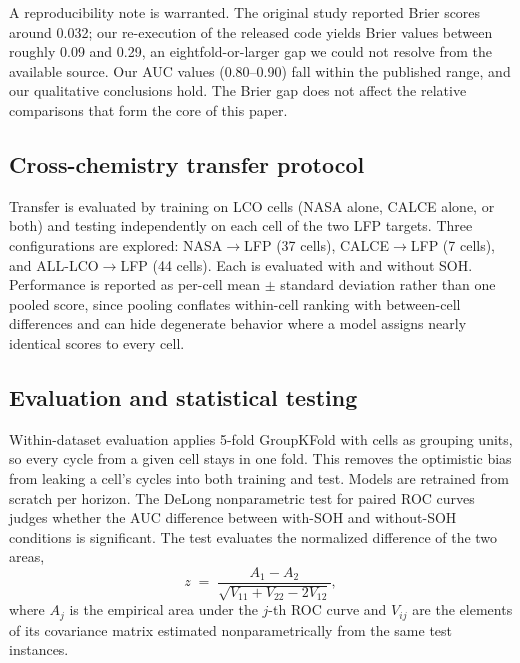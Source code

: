 \documentclass[journal]{IEEEtran}
\begin{document}
A reproducibility note is warranted. The original study \cite{shikdar2026learning} reported Brier scores around 0.032; our re-execution of the released code yields Brier values between roughly 0.09 and 0.29, an eightfold-or-larger gap we could not resolve from the available source. Our AUC values (0.80--0.90) fall within the published range, and our qualitative conclusions hold. The Brier gap does not affect the relative comparisons that form the core of this paper.

\subsection{Cross-chemistry transfer protocol}
Transfer is evaluated by training on LCO cells (NASA alone, CALCE alone, or both) and testing independently on each cell of the two LFP targets. Three configurations are explored: NASA$\to$LFP (37 cells), CALCE$\to$LFP (7 cells), and ALL-LCO$\to$LFP (44 cells). Each is evaluated with and without SOH. Performance is reported as per-cell mean $\pm$ standard deviation rather than one pooled score, since pooling conflates within-cell ranking with between-cell differences and can hide degenerate behavior where a model assigns nearly identical scores to every cell.

\subsection{Evaluation and statistical testing}
Within-dataset evaluation applies 5-fold GroupKFold with cells as grouping units, so every cycle from a given cell stays in one fold. This removes the optimistic bias from leaking a cell's cycles into both training and test. Models are retrained from scratch per horizon. The DeLong nonparametric test \cite{delong1988comparing} for paired ROC curves judges whether the AUC difference between with-SOH and without-SOH conditions is significant. The test evaluates the normalized difference of the two areas,
\begin{equation}\label{eq:delong}
z \;=\; \frac{A_1 - A_2}{\sqrt{V_{11}+V_{22}-2V_{12}}},
\end{equation}
where $A_j$ is the empirical area under the $j$-th ROC curve and $V_{ij}$ are the elements of its covariance matrix estimated nonparametrically from the same test instances.
\end{document}
